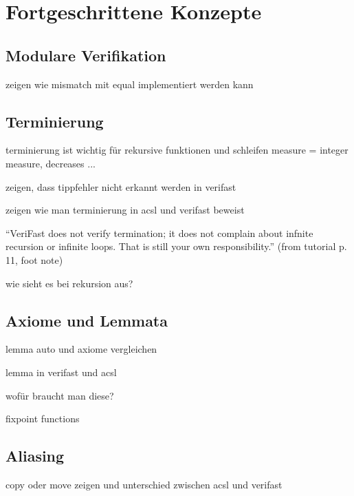 ﻿
\chapter{Fortgeschrittene Konzepte}

\section{Modulare Verifikation}

zeigen wie mismatch mit equal implementiert werden kann


\section{Terminierung}

terminierung ist wichtig für rekursive funktionen und schleifen
measure = integer measure, decreases ...

zeigen, dass tippfehler nicht erkannt werden in verifast

zeigen wie man terminierung in acsl und verifast beweist

“VeriFast does not verify termination; it does not complain about infnite recursion or infinite loops. That is still your own responsibility.” (from tutorial p. 11, foot note)


wie sieht es bei rekursion aus?


\section{Axiome und Lemmata}

lemma auto und axiome vergleichen

lemma in verifast und acsl

wofür braucht man diese?

fixpoint functions

\section{Aliasing}

copy oder move zeigen und unterschied zwischen acsl und verifast

